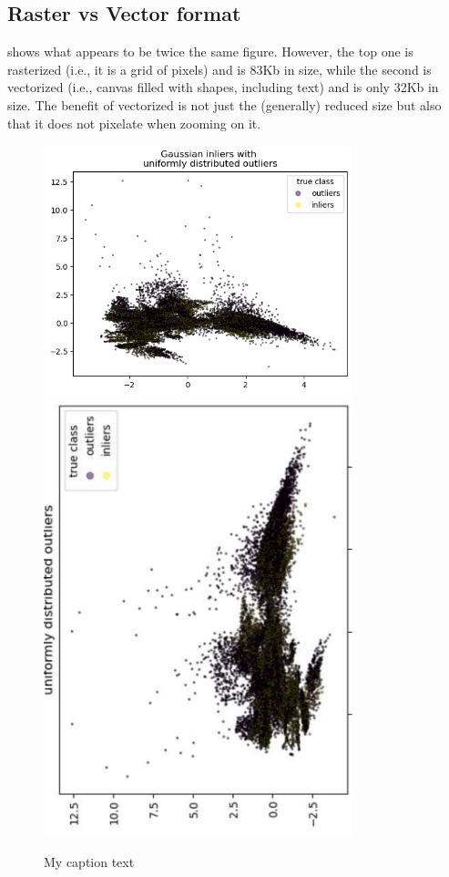 \subsection{Raster vs Vector format}
\label{sec:RasterVsVector}

 shows what appears to be twice the same figure. However, the top one is rasterized (i.e., it is a grid of pixels) and is 83Kb in size, while the second is vectorized (i.e., canvas filled with shapes, including text) and is only 32Kb in size. 
The benefit of vectorized is not just the (generally) reduced size but also that it does not pixelate when zooming on it.

\begin{figure}[!ht]
    \centering
    \includegraphics[width=0.8\textwidth]{manual/images/graph_a.png}
    \includegraphics[angle=-90,width=0.8\textwidth]{manual/images/graph_a.pdf}
    \caption{My caption text}
    \label{fig:RasterVsVector}
\end{figure}

